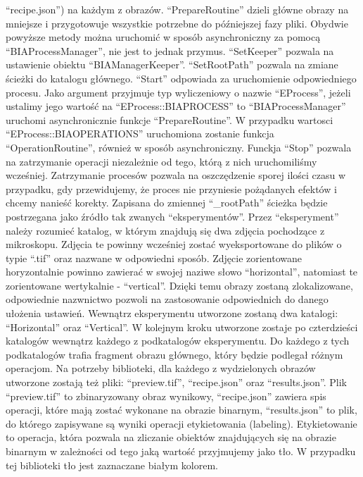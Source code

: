 \documentclass{article}
\begin{document}
{            ``recipe.json'') na każdym z obrazów.
            ``PrepareRoutine'' dzieli główne obrazy na mniejsze i przygotowuje wszystkie potrzebne do późniejszej fazy pliki.
            Obydwie powyższe metody można uruchomić w sposób asynchroniczny za pomocą ``BIAProcessManager'', nie jest to jednak przymus.
            ``SetKeeper'' pozwala na ustawienie obiektu ``BIAManagerKeeper''.
            ``SetRootPath'' pozwala na zmiane ścieżki do katalogu głównego.
            ``Start'' odpowiada za uruchomienie odpowiedniego procesu. Jako argument przyjmuje typ wyliczeniowy o nazwie ``EProcess'', jeżeli ustalimy jego wartość na ``EProcess::BIAPROCESS'' to ``BIAProcessManager'' uruchomi asynchronicznie funkcje ``PrepareRoutine''.
            W przypadku wartosci ``EProcess::BIAOPERATIONS'' uruchomiona zostanie funkcja ``OperationRoutine'', również w sposób asynchroniczny.
            Funckja ``Stop'' pozwala na zatrzymanie operacji niezależnie od tego, którą z nich uruchomiliśmy wcześniej.
            Zatrzymanie procesów pozwala na oszczędzenie sporej ilości czasu w przypadku, gdy przewidujemy, że proces nie przyniesie pożądanych efektów i chcemy nanieść korekty.
            Zapisana do zmiennej ``\_rootPath'' ścieżka będzie postrzegana jako źródło tak zwanych ``eksperymentów''.
            Przez ``eksperyment'' należy rozumieć katalog, w którym znajdują się dwa zdjęcia pochodzące z mikroskopu.
            Zdjęcia te powinny wcześniej zostać wyeksportowane do plików o typie ``.tif'' oraz nazwane w odpowiedni sposób.
            Zdjęcie zorientowane horyzontalnie powinno zawierać w swojej naziwe słowo ``horizontal'', natomiast te zorientowane wertykalnie - ``vertical''.
            Dzięki temu obrazy zostaną zlokalizowane, odpowiednie nazwnictwo pozwoli na zastosowanie odpowiednich do danego ułożenia ustawień.
            Wewnątrz eksperymentu utworzone zostaną dwa katalogi: ``Horizontal'' oraz ``Vertical''.
            W kolejnym kroku utworzone zostaje po czterdzieści katalogów wewnątrz każdego z podkatalogów eksperymentu.
            Do każdego z tych podkatalogów trafia fragment obrazu głównego, który będzie podlegał różnym operacjom.
            Na potrzeby biblioteki, dla każdego z wydzielonych obrazów utworzone zostają też pliki: ``preview.tif'', ``recipe.json'' oraz ``results.json''.
            Plik ``preview.tif'' to zbinaryzowany obraz wynikowy, ``recipe.json'' zawiera spis operacji, które mają zostać wykonane na obrazie binarnym, ``results.json'' to plik, do którego zapisywane są wyniki operacji etykietowania (labeling).
            Etykietowanie to operacja, która pozwala na zliczanie obiektów znajdujących się na obrazie binarnym w zależności od tego jaką wartość przyjmujemy jako tło.
            W przypadku tej biblioteki tło jest zaznaczane białym kolorem.
        }
\end{document}
